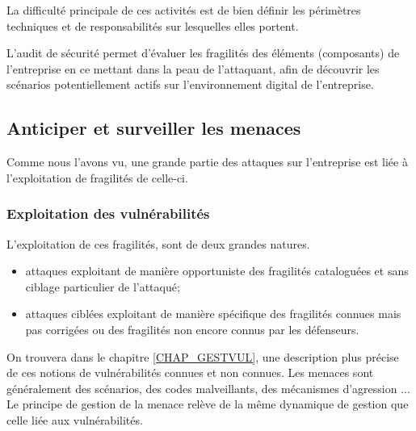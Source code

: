 La difficulté principale de ces activités est de bien définir les périmètres techniques et de responsabilités sur lesquelles elles portent.

L'audit de sécurité permet d'évaluer les fragilités des éléments (composants) de l'entreprise en ce mettant dans la peau de l'attaquant, afin de découvrir les scénarios potentiellement actifs sur l'environnement digital de l'entreprise.

\subsection{Anticiper et surveiller les menaces }

Comme nous l'avons vu, une grande partie des attaques sur l'entreprise est liée à l'exploitation de fragilités de celle-ci. 

\begin{frame}
\frametitle<presentation>{Exploitation des vulnérabilités}
L'exploitation de ces fragilités, sont de deux grandes natures.
\begin{itemize}
	\item attaques exploitant de manière opportuniste des fragilités cataloguées et sans ciblage particulier de l'attaqué;
	\item attaques ciblées exploitant de manière spécifique des fragilités connues mais pas corrigées ou des fragilités non encore connus par les défenseurs.
\end{itemize}
\end{frame}

On trouvera dans le chapitre \ref{CHAP_GESTVUL}, une description plus précise de ces notions de vulnérabilités connues et non connues. Les menaces sont généralement des scénarios, des codes malveillants, des mécanismes d'agression  ...
Le principe de gestion de la menace relève de la même dynamique de gestion que celle liée aux vulnérabilités. 


